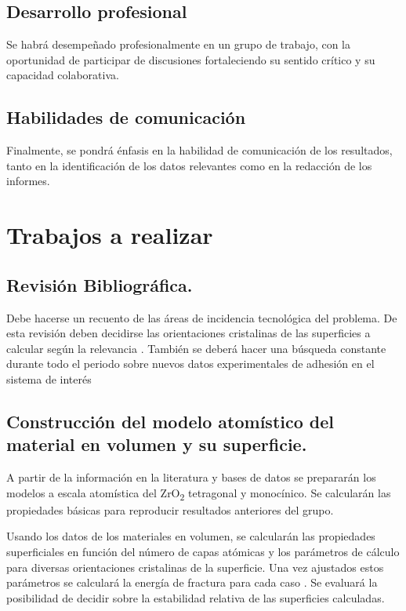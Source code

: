 \subsection{ Desarrollo profesional}

Se habrá desempeñado profesionalmente en un grupo de trabajo, con la 
oportunidad de participar de discusiones fortaleciendo su sentido crítico y su capacidad colaborativa.

\subsection{ Habilidades de comunicación }

Finalmente, se pondrá énfasis en la habilidad de comunicación de los 
resultados, tanto en la identificación de los datos relevantes como en la 
redacción de los informes. 

\section{Trabajos a realizar}

\subsection{ Revisión Bibliográfica. }

Debe hacerse un recuento de las áreas de incidencia tecnológica del 
problema. 
De esta revisión deben decidirse las orientaciones cristalinas de las 
superficies a calcular según la relevancia . 
También se deberá hacer 
una búsqueda constante durante todo el periodo sobre nuevos datos 
experimentales de adhesión en el sistema de interés

\subsection{ Construcción del modelo atomístico del material en volumen y su superficie.}

A partir de la información en la literatura y bases de datos 
se prepararán los modelos a escala atomística del ZrO\textsubscript{2} 
tetragonal y monocínico. Se calcularán las propiedades básicas para 
reproducir resultados anteriores del grupo. 

Usando los datos de los materiales en volumen, 
se calcularán las propiedades superficiales en función del número de 
capas atómicas y los parámetros de cálculo para diversas orientaciones 
cristalinas de la superficie. Una vez ajustados estos parámetros se 
calculará la energía de fractura para cada caso  
\cite{Jiangetal}. Se evaluará la posibilidad de decidir sobre la
estabilidad relativa de las superficies
calculadas. 

